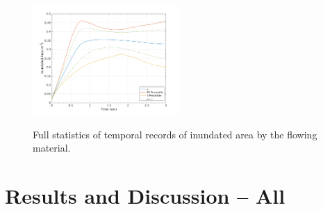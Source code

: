 \documentclass{article}
\begin{document}
\begin{figure}[H]
        \begin{minipage}[b]{1\linewidth}
                \centering
                \includegraphics[width=0.5\textwidth]{InclinedPlane/GlobalRecords/V_Global_Ar.png}
                \label{fig:Ramp-SP-InundAr-V}
        \end{minipage}
        \caption{Full statistics of temporal records of inundated area by the flowing material.}
        \label{fig:Ramp-SP-InundAr}
\end{figure}

\section{Results and Discussion -- All}

\newpage


\end{document}
